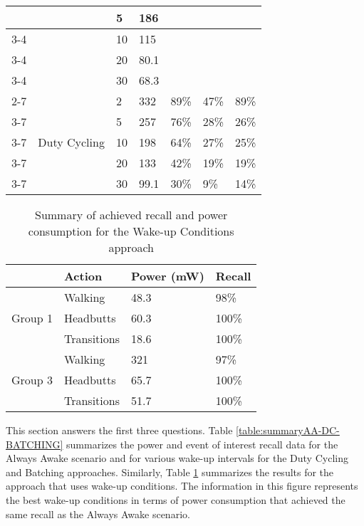 \begin{table*}[t]
\begin{tabular}{|l|l|l|l|l|l|l|}
								& 								& 5			& 186		&						&							&							\\ \cline{3-4}
								& 								& 10		& 115		&						&							&							\\ \cline{3-4}
								& 								& 20		& 80.1		&						&							&							\\ \cline{3-4}
								& 								& 30		& 68.3		&						&							&							\\ \cline{2-7}
								& \multirow{5}{*}{Duty Cycling}	& 2			& 332		& 89\%					& 47\%						& 89\%						\\ \cline{3-7}
								& 								& 5			& 257		& 76\%					& 28\%						& 26\%						\\ \cline{3-7}
								& 								& 10		& 198		& 64\%					& 27\%						& 25\%						\\ \cline{3-7}
								& 								& 20		& 133		& 42\%					& 19\%						& 19\%						\\ \cline{3-7}
								& 								& 30		& 99.1		& 30\%					& 9\%						& 14\%						\\ \hline
    \end{tabular}
	\caption{Summary of achieved recall and power consumption for the Always Awake, Duty Cycling and Batching approaches}
	\label{table:summaryAA-DC-BATCHING}
\end{table*}

\begin{table}[t]
    \begin{tabular}{|l|l|l|l|}
	\hline
    ~       					& Action      & Power (mW) & Recall \\ \hline
    \multirow{3}{*}{Group 1} 	& Walking     & 48.3       & 98\%   \\ \cline{2-4}
								& Headbutts   & 60.3       & 100\%  \\ \cline{2-4}
								& Transitions & 18.6       & 100\%  \\ \hline
    \multirow{3}{*}{Group 3} 	& Walking     & 321        & 97\%   \\ \cline{2-4}
								& Headbutts   & 65.7       & 100\%  \\ \cline{2-4}
								& Transitions & 51.7       & 100\%  \\ \hline
    \end{tabular}
	\caption{Summary of achieved recall and power consumption for the Wake-up Conditions approach}
	\label{table:summaryWUC}
\end{table}

This section answers the first three questions. Table \ref{table:summaryAA-DC-BATCHING} summarizes the power and event of interest recall data for the Always Awake scenario and for various wake-up intervals for the Duty Cycling and Batching approaches. Similarly, Table \ref{table:summaryWUC} summarizes the results for the approach that uses wake-up conditions. The information in this figure represents the best wake-up conditions in terms of power consumption that achieved the same recall as the Always Awake scenario.

